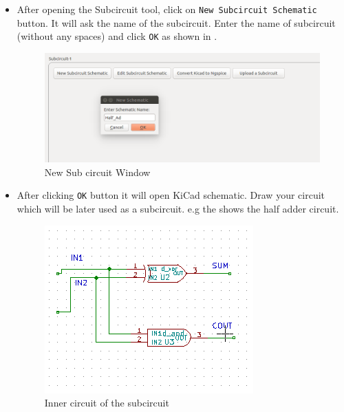 \begin{itemize}

\item After opening the Subcircuit tool, click on {\tt New Subcircuit Schematic} button. It will ask the name of the subcircuit. Enter the name of subcircuit (without any spaces) and click {\tt OK} as shown in .
      


        \begin{figure}[!htp]
            \centering
            \includegraphics[width =\lgfig]{newsubckt.png}
            \caption{New Sub circuit Window}
            \label{newsubcktschematic}
        \end{figure}

\item After clicking {\tt OK} button it will open KiCad schematic. Draw your circuit which will be later used as a subcircuit. e.g the  shows the half adder circuit.
        
        \begin{figure}[!htp]
            \centering
            \includegraphics[width =\lgfig]{createsubcktsch.png}
            \caption{Inner circuit of the subcircuit}
            \label{createsubcktsch}
         \end{figure}




\end{itemize}
